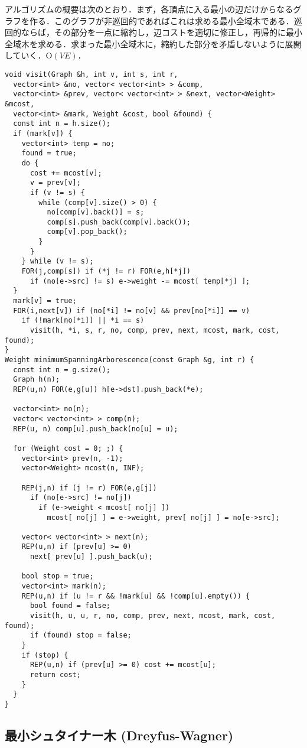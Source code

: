 アルゴリズムの概要は次のとおり．まず，各頂点に入る最小の辺だけからなるグラフを作る．このグラフが非巡回的であればこれは求める最小全域木である．巡回的ならば，その部分を一点に縮約し，辺コストを適切に修正し，再帰的に最小全域木を求める．求まった最小全域木に，縮約した部分を矛盾しないように展開していく．$\mathrm{O}(V E)$．

\begin{lstlisting}
void visit(Graph &h, int v, int s, int r,
  vector<int> &no, vector< vector<int> > &comp,
  vector<int> &prev, vector< vector<int> > &next, vector<Weight> &mcost,
  vector<int> &mark, Weight &cost, bool &found) {
  const int n = h.size();
  if (mark[v]) {
    vector<int> temp = no;
    found = true;
    do {
      cost += mcost[v];
      v = prev[v];
      if (v != s) {
        while (comp[v].size() > 0) {
          no[comp[v].back()] = s;
          comp[s].push_back(comp[v].back());
          comp[v].pop_back();
        }
      }
    } while (v != s);
    FOR(j,comp[s]) if (*j != r) FOR(e,h[*j])
      if (no[e->src] != s) e->weight -= mcost[ temp[*j] ];
  }
  mark[v] = true;
  FOR(i,next[v]) if (no[*i] != no[v] && prev[no[*i]] == v)
    if (!mark[no[*i]] || *i == s)
      visit(h, *i, s, r, no, comp, prev, next, mcost, mark, cost, found);
}
Weight minimumSpanningArborescence(const Graph &g, int r) {
  const int n = g.size();
  Graph h(n);
  REP(u,n) FOR(e,g[u]) h[e->dst].push_back(*e);

  vector<int> no(n);
  vector< vector<int> > comp(n);
  REP(u, n) comp[u].push_back(no[u] = u);

  for (Weight cost = 0; ;) {
    vector<int> prev(n, -1);
    vector<Weight> mcost(n, INF);

    REP(j,n) if (j != r) FOR(e,g[j])
      if (no[e->src] != no[j])
        if (e->weight < mcost[ no[j] ])
          mcost[ no[j] ] = e->weight, prev[ no[j] ] = no[e->src];

    vector< vector<int> > next(n);
    REP(u,n) if (prev[u] >= 0)
      next[ prev[u] ].push_back(u);

    bool stop = true;
    vector<int> mark(n);
    REP(u,n) if (u != r && !mark[u] && !comp[u].empty()) {
      bool found = false;
      visit(h, u, u, r, no, comp, prev, next, mcost, mark, cost, found);
      if (found) stop = false;
    }
    if (stop) {
      REP(u,n) if (prev[u] >= 0) cost += mcost[u];
      return cost;
    }
  }
}
\end{lstlisting}



\subsection{最小シュタイナー木 (Dreyfus-Wagner)}


